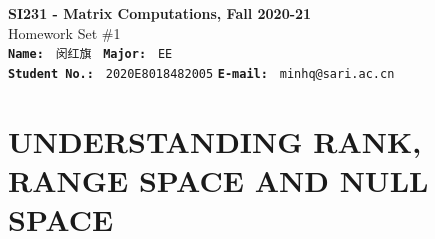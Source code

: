 \documentclass[english,onecolumn,UTF8]{IEEEtran}
\begin{document}
\begin{center}
\textbf{SI231 - Matrix Computations, Fall 2020-21} \\ Homework Set \#1\\
\texttt{\textbf{Name:}}   	\texttt{ 闵红旗 }  		\hspace{1bp}
\texttt{\textbf{Major:}}  	\texttt{ EE } 	\\
\texttt{\textbf{Student No.:}} 	\texttt{ 2020E8018482005}     \hspace{1bp}
\texttt{\textbf{E-mail:}} 	\texttt{ minhq@sari.ac.cn}
\par\end{center}

\section{UNDERSTANDING RANK, RANGE SPACE AND NULL SPACE}
\end{document}
